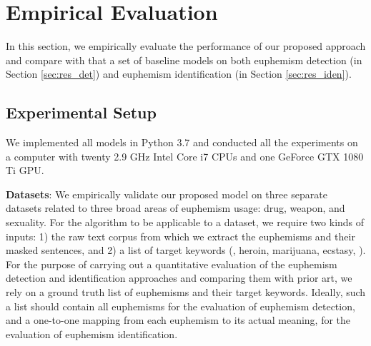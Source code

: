 \section{Empirical Evaluation}
\label{sec:res}
In this section, we empirically evaluate the performance of our proposed approach and compare with that a set of baseline models on both euphemism detection (in Section \ref{sec:res_det}) and euphemism identification (in Section \ref{sec:res_iden}). 

\subsection{Experimental Setup}
We implemented all  models in Python 3.7 and conducted all the experiments on a computer with twenty 2.9 GHz Intel Core i7 CPUs and one GeForce GTX 1080 Ti GPU. 

\noindent \textbf{Datasets}: 
We empirically validate our proposed model on  three separate datasets related to three broad areas of euphemism usage: drug, weapon, and sexuality. 
For the algorithm to be applicable to a dataset, we require two kinds of inputs: 1) the raw text corpus from which we extract the euphemisms and their masked sentences, and 2) a list of target keywords (\eg, heroin, marijuana, ecstasy, \etc). 
For the purpose of carrying out a quantitative evaluation of the euphemism detection and identification approaches and comparing them with prior art, we rely on a ground truth list of  euphemisms and their target keywords. Ideally, such a list  should contain all  euphemisms for the evaluation of euphemism detection, and a one-to-one mapping from each euphemism to its actual meaning, for the evaluation of euphemism identification. 

